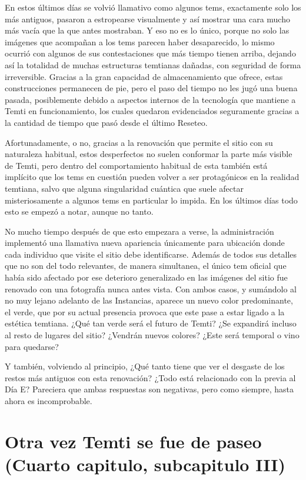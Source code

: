 \documentclass[
  spanish,
]{book}
\begin{document}
En estos últimos días se volvió llamativo como algunos tems, exactamente solo los más antiguos, pasaron a estropearse visualmente y así mostrar una cara mucho más vacía que la que antes mostraban. Y eso no es lo único, porque no solo las imágenes que acompañan a los tems parecen haber desaparecido, lo mismo ocurrió con algunos de sus contestaciones que más tiempo tienen arriba, dejando así la totalidad de muchas estructuras temtianas dañadas, con seguridad de forma irreversible.
Gracias a la gran capacidad de almacenamiento que ofrece, estas construcciones permanecen de pie, pero el paso del tiempo no les jugó una buena pasada, posiblemente debido a aspectos internos de la tecnología que mantiene a Temti en funcionamiento, los cuales quedaron evidenciados seguramente gracias a la cantidad de tiempo que pasó desde el último Reseteo.

Afortunadamente, o no, gracias a la renovación que permite el sitio con su naturaleza habitual, estos desperfectos no suelen conformar la parte más visible de Temti, pero dentro del comportamiento habitual de esta también está implícito que los tems en cuestión pueden volver a ser protagónicos en la realidad temtiana, salvo que alguna singularidad cuántica que suele afectar misteriosamente a algunos tems en particular lo impida. En los últimos días todo esto se empezó a notar, aunque no tanto.

No mucho tiempo después de que esto empezara a verse, la administración implementó una llamativa nueva apariencia únicamente para ubicación donde cada individuo que visite el sitio debe identificarse. Además de todos sus detalles que no son del todo relevantes, de manera simultanea, el único tem oficial que había sido afectado por ese deterioro generalizado en las imágenes del sitio fue renovado con una fotografía nunca antes vista.
Con ambos casos, y sumándolo al no muy lejano adelanto de las Instancias, aparece un nuevo color predominante, el verde, que por su actual presencia provoca que este pase a estar ligado a la estética temtiana. ¿Qué tan verde será el futuro de Temti? ¿Se expandirá incluso al resto de lugares del sitio? ¿Vendrán nuevos colores? ¿Este será temporal o vino para quedarse?

Y también, volviendo al principio, ¿Qué tanto tiene que ver el desgaste de los restos más antiguos con esta renovación? ¿Todo está relacionado con la previa al Día E?
Pareciera que ambas respuestas son negativas, pero como siempre, hasta ahora es incomprobable.

\hypertarget{otra-vez-temti-se-fue-de-paseo-cuarto-capitulo-subcapitulo-iii}{%
\section{Otra vez Temti se fue de paseo (Cuarto capitulo, subcapitulo III)}\label{otra-vez-temti-se-fue-de-paseo-cuarto-capitulo-subcapitulo-iii}}
\end{document}
